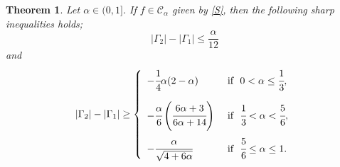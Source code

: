 \documentclass[a4paper,12pt]{amsart}
\newtheorem{theorem}{Theorem}[section]
\theoremstyle{definition}
\numberwithin{equation}{section}
\begin{document}
\begin{theorem}
Let $\alpha \in (0,1]$. If $f\in\mathcal{C}_{\alpha}$ given by \eqref{S}, then the following sharp inequalities holds;
\begin{equation}\label{thm1}
|\Gamma_2|-|\Gamma_1| \leq \frac{\alpha}{12}
\end{equation}
and 
\begin{equation}\label{lll}
|\Gamma_2|-|\Gamma_1| \geq \left \{
	\begin{array}{lll}
		  -\cfrac{1}{4}\alpha(2-\alpha)  & {\mbox{ if }} \,\,  0 < \alpha \leq \cfrac{1}{3}, \\[5mm]
		 -\cfrac{\alpha}{6} \left( \cfrac{6\alpha+3}{6\alpha+14} \right)    &  {\mbox{ if }} \,\, \cfrac{1}{3} < \alpha < \cfrac{5}{6}, \\[5mm]
		 -\cfrac{\alpha}{\sqrt{4+6\alpha}} &  {\mbox{ if }} \,\, \cfrac{5}{6} \leq \alpha \leq 1.
	\end{array}
	\right.
\end{equation}
\end{theorem}
\end{document}
